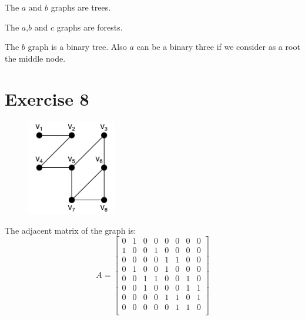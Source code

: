 \documentclass{article}
\begin{document}
\begin{figure}[H]
\begin{minipage}[b]{0.4\textwidth}
            \subcaption{}
            \label{fig:figure-7-3}
        \end{minipage}
    \end{figure}
    
    The \(a\) and \(b\) graphs are trees.\newline
    \par\noindent The \(a\),\(b\) and \(c\) graphs are forests.\newline
    \par\noindent The \(b\) graph is a binary tree. Also \(a\) can be a binary three if we consider as a root the middle node.\newline
    
\section{Exercise 8}
    \begin{figure}[H]
        \centering
        \includegraphics[width=0.35\textwidth]{11.png}
        \label{fig:figure-8}
    \end{figure}
    
    The adjacent matrix of the graph is:
    \begin{equation*}
    A =
        \begin{bmatrix}
        0 & 1 & 0 & 0 & 0 & 0 & 0 & 0\\
        1 & 0 & 0 & 1 & 0 & 0 & 0 & 0\\
        0 & 0 & 0 & 0 & 1 & 1 & 0 & 0\\
        0 & 1 & 0 & 0 & 1 & 0 & 0 & 0\\
        0 & 0 & 1 & 1 & 0 & 0 & 1 & 0\\
        0 & 0 & 1 & 0 & 0 & 0 & 1 & 1\\
        0 & 0 & 0 & 0 & 1 & 1 & 0 & 1\\
        0 & 0 & 0 & 0 & 0 & 1 & 1 & 0\\
        \end{bmatrix}
    \end{equation*}
    
\end{document}
